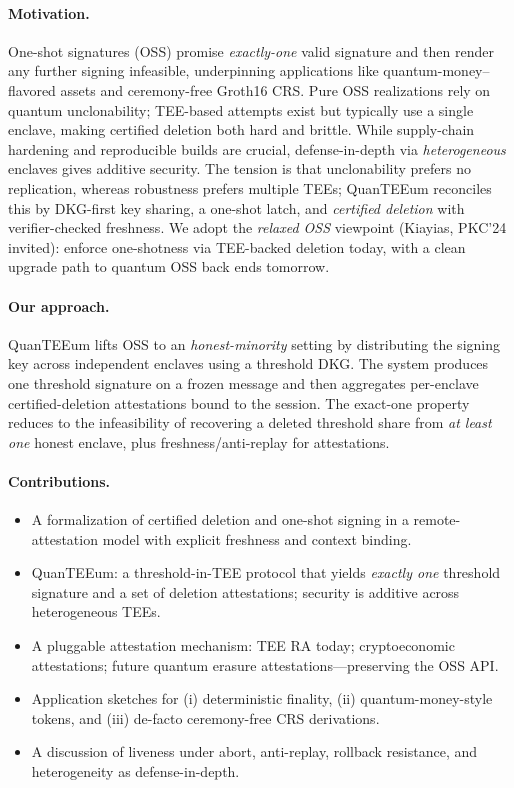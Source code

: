 \documentclass[runningheads,orivec]{llncs}
\newcommand{\prot}{\textsf{QuanTEEum}}
\begin{document}
\paragraph{Motivation.}
One-shot signatures (OSS) promise \emph{exactly-one} valid signature and then render any further signing infeasible, underpinning applications like quantum-money–flavored assets and ceremony-free Groth16 CRS. Pure OSS realizations rely on quantum unclonability; TEE-based attempts exist but typically use a single enclave, making certified deletion both hard and brittle. While supply-chain hardening and reproducible builds are crucial, defense-in-depth via \emph{heterogeneous} enclaves gives additive security. The tension is that unclonability prefers no replication, whereas robustness prefers multiple TEEs; QuanTEEum reconciles this by DKG-first key sharing, a one-shot latch, and \emph{certified deletion} with verifier-checked freshness. We adopt the \emph{relaxed OSS} viewpoint (Kiayias, PKC’24 invited): enforce one-shotness via TEE-backed deletion today, with a clean upgrade path to quantum OSS back ends tomorrow.


\paragraph{Our approach.}
\prot{} lifts OSS to an \emph{honest-minority} setting by distributing the signing key across independent enclaves using a threshold DKG. The system produces one threshold signature on a frozen message and then aggregates per-enclave certified-deletion attestations bound to the session. The exact-one property reduces to the infeasibility of recovering a deleted threshold share from \emph{at least one} honest enclave, plus freshness/anti-replay for attestations.

\paragraph{Contributions.}
\begin{itemize}[leftmargin=*,itemsep=0.25em,topsep=0.25em]
  \item A formalization of certified deletion and one-shot signing in a remote-attestation model with explicit freshness and context binding.
  \item \prot{}: a threshold-in-TEE protocol that yields \emph{exactly one} threshold signature and a set of deletion attestations; security is additive across heterogeneous TEEs.
  \item A pluggable attestation mechanism: TEE RA today; cryptoeconomic attestations; future quantum erasure attestations---preserving the OSS API.
  \item Application sketches for (i) deterministic finality, (ii) quantum-money-style tokens, and (iii) de-facto ceremony-free CRS derivations.
  \item A discussion of liveness under abort, anti-replay, rollback resistance, and heterogeneity as defense-in-depth.
\end{itemize}
\end{document}
